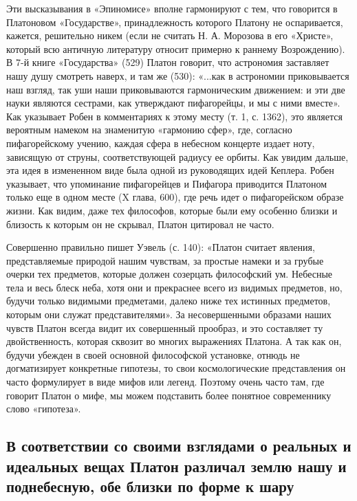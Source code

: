 Эти высказывания в «Эпиномисе» вполне гармонируют с тем, что говорится
в  Платоновом   «Государстве»,  принадлежность  которого   Платону  не
оспаривается,  кажется,  решительно  никем  (если  не  считать  Н.  А.
Морозова  в  его «Христе»,  который  всю  античную литературу  относит
примерно  к  раннему Возрождению).  В  7-й  книге «Государства»  (529)
Платон говорит, что астрономия заставляет нашу душу смотреть наверх, и
там же (530):  «...как в астрономии приковывается наш  взгляд, так уши
наши приковываются  гармоническим движением: и эти  две науки являются
сестрами,  как  утверждают  пифагорейцы,  и мы  с  ними  вместе».  Как
указывает  Робен  в  комментариях  к  этому месту  (т.  1,  с.  1362),
это  является вероятным  намеком на  знаменитую «гармонию  сфер», где,
согласно  пифагорейскому  учению,  каждая сфера  в  небесном  концерте
издает ноту,  зависящую от струны, соответствующей  радиусу ее орбиты.
Как  увидим  дальше,  эта  идея   в  измененном  виде  была  одной  из
руководящих идей Кеплера. Робен указывает, что упоминание пифагорейцев
и  Пифагора приводится  Платоном только  еще в  одном месте  (X глава,
600), где речь идет о пифагорейском  образе жизни. Как видим, даже тех
философов, которые были ему особенно близки и близость к которым он не
скрывал, Платон цитировал не часто.

Совершенно правильно  пишет Уэвель (с. 140):  «Платон считает явления,
представляемые  природой  нашим  чувствам,  за  простые  намеки  и  за
грубые очерки тех предметов,  которые должен созерцать философский ум.
Небесные  тела и  весь  блеск неба,  хотя они  и  прекраснее всего  из
видимых  предметов,  но,  будучи только  видимыми  предметами,  далеко
ниже  тех истинных  предметов,  которым  они служат  представителями».
За  несовершенными  образами  наших  чувств  Платон  всегда  видит  их
совершенный  прообраз, и  это  составляет  ту двойственность,  которая
сквозит во  многих выражениях  Платона. А так  как он,  будучи убежден
в  своей  основной  философской  установке,  отнюдь  не  догматизирует
конкретные гипотезы,  то свои  космологические представления  он часто
формулирует  в виде  мифов или  легенд. Поэтому  очень часто  там, где
говорит Платон о мифе, мы можем подставить более понятное современнику
слово «гипотеза».

\subsection{В соответствии со своими  взглядами о реальных и идеальных
вещах Платон различал землю нашу и  поднебесную, обе близки по форме к
шару}

